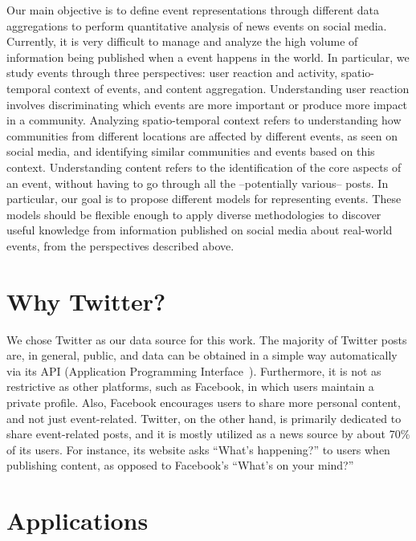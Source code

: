 Our main objective is to define event representations through different data
aggregations to perform quantitative analysis of news events on social media.
%
Currently, it is very difficult to manage and analyze the high volume of
information being published when a event happens in the world. 
%
In particular, we study events through three perspectives: user reaction
and activity, spatio-temporal context of events, and content aggregation.
%
Understanding user reaction involves discriminating which events are more
important or produce more impact in a community. 
%
Analyzing spatio-temporal context refers to understanding how communities from
different locations are affected by different events, as seen on social media,
and identifying similar communities and events based on this context. 
%
Understanding content refers to the identification of the core aspects of an
event, without having to go through all the --potentially various-- posts.
%
In particular, our goal is to propose different models for representing events. 
%
These models should be flexible enough to apply diverse methodologies to
discover useful knowledge from information published on social media about
real-world events, from the perspectives described above. 



\section{Why Twitter?} 

We chose Twitter as our data source for this work. 
%
The majority of Twitter posts are, in general, public, and data can be obtained
in a simple way automatically via its API (Application Programming
Interface~\cite{twitterapi}).
%
Furthermore, it is not as restrictive as other platforms, such as Facebook,
in which users maintain a private profile.
%
Also, Facebook encourages users to share more personal content, and not just
event-related.
%
Twitter, on the other hand, is primarily dedicated to share event-related posts,
and it is mostly utilized as a news source by about 70\% of its users. 
%
For instance, its website asks ``What's happening?'' to users when publishing
content, as opposed to Facebook's ``What's on your mind?''


\section{Applications}

